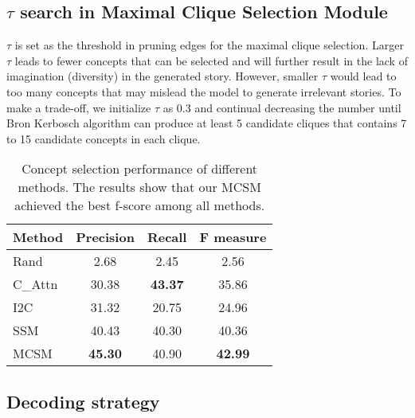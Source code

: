 \subsection{$\tau$ search in Maximal Clique Selection Module}
 $\tau$ is set as the threshold in pruning edges for the maximal clique selection. Larger $\tau$ leads to fewer concepts that can be selected and will further result in the lack of imagination (diversity) in the generated story. However, smaller $\tau$ would lead to too many concepts that may mislead the model to generate irrelevant stories. To make a trade-off, we initialize $\tau$ as 0.3 and continual decreasing the number until Bron Kerbosch algorithm \cite{10.1145/362342.362367} can produce at least 5 candidate cliques that contains 7 to 15 candidate concepts in each clique.
 


\begin{table}[t]
\centering
\begin{tabular}{l|c|c|c}
\hline
 Method&  Precision& Recall&  F measure \\\hline\hline
 Rand&  2.68&  2.45&  2.56 \\\hline
 C\_Attn&  30.38&  \textbf{43.37}&  35.86 \\\hline
 I2C&  31.32&  20.75&  24.96\\\hline
 SSM&  40.43&  40.30&  40.36\\\hline
 MCSM&  \textbf{45.30}&  40.90&  \textbf{42.99}\\
  \hline
\end{tabular}
\caption{Concept selection performance of different methods. The results show that our MCSM achieved the best f-score among all methods.}
\label{tab:acc}
\end{table}









\subsection{Decoding strategy}

